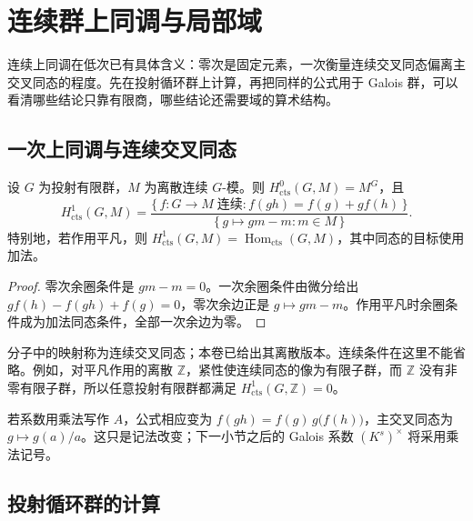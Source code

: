 

\section{连续群上同调与局部域}
\label{b4:sec:C02}

连续上同调在低次已有具体含义：零次是固定元素，一次衡量连续交叉同态偏离主交叉同态的程度。先在投射循环群上计算，再把同样的公式用于 Galois 群，可以看清哪些结论只靠有限商，哪些结论还需要域的算术结构。

\subsection{一次上同调与连续交叉同态}
\label{b4:subsec:C02:01}

\begin{proposition}\label{b4:prop:C-continuous-h1}
	设 \(G\) 为投射有限群，\(M\) 为离散连续 \(G\)-模。则 \(H^0_{\mathrm{cts}}(G,M)=M^G\)，且
	\[
		H^1_{\mathrm{cts}}(G,M) =\frac{\bigl\{\,f:G\rightarrow M\;\text{连续}:f(gh)=f(g)+gf(h)\,\bigr\}} {\{\,g\mapsto gm-m:m\in M\,\}}.
	\]
	特别地，若作用平凡，则 \(H^1_{\mathrm{cts}}(G,M)=\operatorname{Hom}_{\mathrm{cts}}(G,M)\)，其中同态的目标使用加法。
\end{proposition}
\begin{proof}
	零次余圈条件是 \(gm-m=0\)。一次余圈条件由微分给出 \(gf(h)-f(gh)+f(g)=0\)，零次余边正是 \(g\mapsto gm-m\)。作用平凡时余圈条件成为加法同态条件，全部一次余边为零。
\end{proof}

分子中的映射称为连续交叉同态；本卷已给出其离散版本。连续条件在这里不能省略。例如，对平凡作用的离散 \(\mathbb Z\)，紧性使连续同态的像为有限子群，而 \(\mathbb Z\) 没有非零有限子群，所以任意投射有限群都满足 \(H^1_{\mathrm{cts}}(G,\mathbb Z)=0\)。

\ProseParagraphBreak
若系数用乘法写作 \(A\)，公式相应变为 \(f(gh)=f(g)\,g\bigl(f(h)\bigr)\)，主交叉同态为 \(g\mapsto g(a)/a\)。这只是记法改变；下一小节之后的 Galois 系数 \((K^s)^\times\) 将采用乘法记号。

\subsection{投射循环群的计算}
\label{b4:subsec:C02:02}

